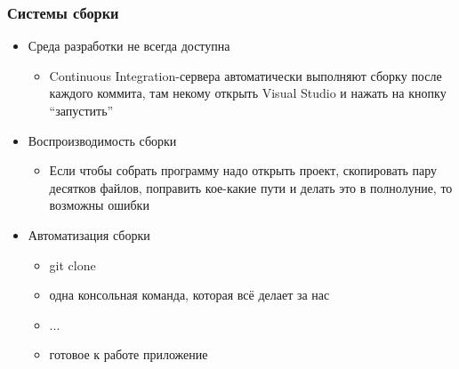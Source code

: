 \documentclass[xetex,mathserif,serif]{beamer}
\begin{document}
	\begin{frame}
		\frametitle{Системы сборки}
		\begin{itemize}
			\item Среда разработки не всегда доступна
			\begin{itemize}
				\item Continuous Integration-сервера автоматически выполняют сборку после каждого коммита, там некому открыть Visual Studio и нажать на кнопку ``запустить''
			\end{itemize}
			\item Воспроизводимость сборки
			\begin{itemize}
				\item Если чтобы собрать программу надо открыть проект, скопировать пару десятков файлов, поправить кое-какие пути и делать это в полнолуние, то возможны ошибки
			\end{itemize}
			\item Автоматизация сборки
			\begin{itemize}
				\item git clone
				\item одна консольная команда, которая всё делает за нас
				\item ...
				\item готовое к работе приложение
			\end{itemize}
		\end{itemize}
	\end{frame}
\end{document}
